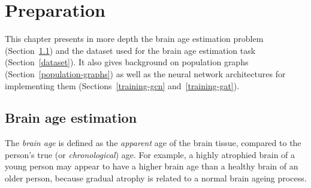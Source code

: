 \chapter{Preparation}



This chapter presents in more depth the brain age estimation problem (Section~\ref{brain-age-estimation}) and the dataset used for the brain age estimation task (Section~\ref{dataset}). It also gives background on population graphs (Section~\ref{population-graphs}) as well as the neural network architectures for implementing them (Sections~\ref{training-gcn} and~\ref{training-gat}).

\section{Brain age estimation}
\label{brain-age-estimation}

The \textit{brain age} is defined as the \textit{apparent} age of the brain tissue, compared to the person's true (or \textit{chronological}) age. For example, a highly atrophied brain of a young person may appear to have a higher brain age than a healthy brain of an older person, because gradual atrophy is related to a normal brain ageing process. 


